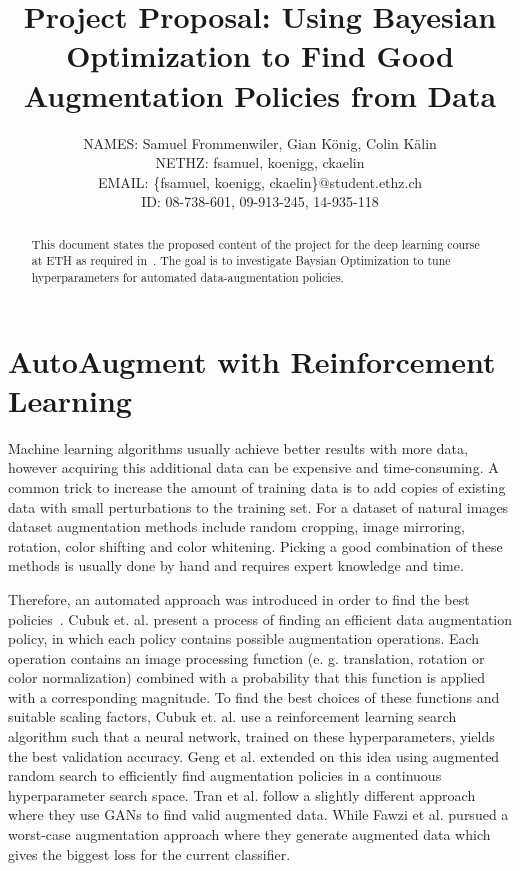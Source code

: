 \documentclass[10pt,twocolumn,letterpaper]{article}
\begin{document}
\title{Project Proposal: Using Bayesian Optimization to Find Good Augmentation Policies from Data}

\author{
    	\small{NAMES: Samuel Frommenwiler, Gian K\"onig, Colin K\"alin} \\
   	\small{NETHZ: fsamuel, koenigg, ckaelin}\\
	\small{EMAIL: \{fsamuel, koenigg, ckaelin\}$@$student.ethz.ch}\\
    	\small{ID: 08-738-601, 09-913-245, 14-935-118}
}

\maketitle

\begin{abstract}
   This document states the proposed content of the project for the deep learning course at ETH as required in~\cite{DL18}. The goal is to investigate Baysian Optimization to tune hyperparameters for automated data-augmentation policies.
\end{abstract}

\section{AutoAugment with Reinforcement Learning}
Machine learning algorithms usually achieve better results with more data, however acquiring this additional data can be expensive and time-consuming.  A common trick to increase the amount of training data is to add copies of existing data with small perturbations to the training set. For a dataset of natural images dataset augmentation methods include random cropping, image mirroring, rotation, color shifting and color whitening. Picking a good combination of these methods is usually done by hand and requires expert knowledge and time.
\par
  Therefore, an automated approach was introduced in order to find the best policies~\cite{Ekin}. Cubuk et. al. present a process of finding an efficient data augmentation policy, in which each policy contains possible augmentation operations. Each operation contains an image processing function (e. g. translation, rotation or color normalization) combined with a probability that this function is applied with a corresponding magnitude. To find the best choices of these functions and suitable scaling factors, Cubuk et. al. use a reinforcement learning search algorithm such that a neural network, trained on these hyperparameters, yields the best validation accuracy.
  Geng et al. \cite{DBLP:journals/corr/abs-1811-04768} extended on this idea using augmented random search to efficiently find augmentation policies in a continuous hyperparameter search space.
  Tran et al. \cite{DBLP:journals/corr/abs-1710-10564} follow a slightly different approach where they use GANs to find valid augmented data. While Fawzi et al. \cite{Fawzi} pursued a worst-case augmentation approach where they generate augmented data which gives the biggest loss for the current classifier.
\end{document}
